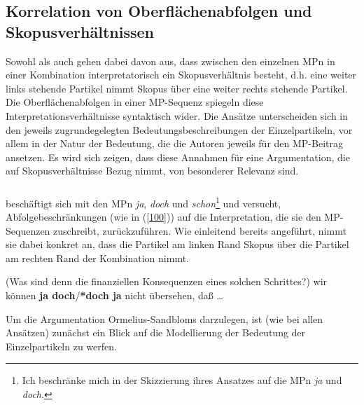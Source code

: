 \subsection{Korrelation von Oberflächenabfolgen und Skopusverhältnissen}
\label{sec:skopus}
Sowohl \citet{Ormelius-Sandblom1997} als auch \citet{Rinas2006, Rinas2007} gehen dabei davon aus, dass zwischen den einzelnen MPn in einer Kombination interpretatorisch ein Skopusverhältnis  besteht, d.h. eine weiter links stehende Partikel nimmt Skopus über eine weiter rechts stehende Partikel. Die Oberflächenabfolgen in einer MP-Sequenz spiegeln diese Interpretationsverhältnisse syntaktisch wider. Die Ansätze unterscheiden sich in den jeweils zugrundegelegten Bedeutungsbeschreibungen der Einzelpartikeln, vor allem in der Natur der Bedeutung, die die Autoren jeweils für den MP-Beitrag ansetzen. Es wird sich zeigen, dass diese Annahmen für eine Argumentation, die auf Skopusverhältnisse Bezug nimmt, von besonderer Relevanz sind. 

\subsubsection{\citet{Ormelius-Sandblom1997}}
\label{sec:os}
\citet{Ormelius-Sandblom1997} beschäftigt sich mit den MPn \textit{ja}, \textit{doch} und \textit{schon}\footnote{Ich beschränke mich in der Skizzierung ihres Ansatzes auf die MPn \textit{ja} und \textit{doch}.} und versucht, Abfolgebeschränkungen (wie in (\ref{100})) auf die Interpretation, die sie den MP-Sequenzen zuschreibt, zurückzuführen. Wie einleitend bereits angeführt, nimmt sie dabei konkret an, dass die Partikel am linken Rand Skopus  über die Partikel am rechten Rand der Kombination nimmt.	

\begin{exe}
	\ex\label{100} 
	(Was sind denn die finanziellen Konsequenzen eines solchen Schrittes?) wir können \textbf{ja doch}/\textbf{*doch ja} nicht übersehen, daß \ldots
	\newline
	\hbox{}\hfill\hbox{\citet[93]{Ormelius-Sandblom1997}}	
\end{exe}
Um die Argumentation Ormelius-Sandbloms darzulegen, ist (wie bei allen Ansätzen) zunächst ein Blick auf die Modellierung der Bedeutung der Einzelpartikeln zu werfen.

